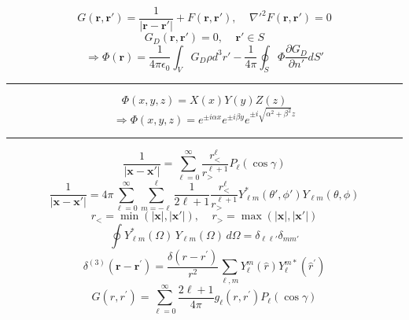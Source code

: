 \documentclass[twocolumn]{article}
\newcommand{\0}{\textcolor{gray}{0}}
\newcommand{\rv}{\mathbf{r}}
\newcommand{\xv}{\mathbf{x}}
\newcommand{\eo}{\epsilon_{0}}
\newcommand{\rdif}{\rv - \rv'}
\begin{document}
\begin{equation*}
	G(\rv,\rv') = \frac{1}{|\rdif|} + F(\rv,\rv'), ~~~~~ \nabla'^2 F(\rv,\rv') = 0
\end{equation*}
\begin{equation*}
	G_{D}(\rv,\rv') = 0, ~~~~~\rv'\in S
\end{equation*}
\begin{equation*}
	\Rightarrow\Phi(\rv) = \frac{1}{4\pi\eo}\int_{V}G_D\rho d^3r' - \frac{1}{4\pi}\oint_{S}\Phi\frac{\partial G_D}{\partial n'} dS'
\end{equation*}
\vspace{-2mm}\hrule\vspace{1mm}
\begin{equation*}
	\Phi(x,y,z) = X(x) Y(y) Z(z)
\end{equation*}
\begin{equation*}
	\Rightarrow\Phi(x,y,z) = e^{\pm i \alpha x} e^{\pm i \beta y} e^{\pm i \sqrt{\alpha^2 + \beta^2} z}
\end{equation*}
\vspace{-2mm}\hrule\vspace{1mm}
\begin{equation*}
	\frac{1}{|\xv - \xv'|} = \sum_{\ell=0}^{\infty} \frac{r_{<}^{\ell}}{r_{>}^{\ell + 1}} P_{\ell}(\cos\gamma)
\end{equation*}
\begin{equation*}
	\frac{1}{|\xv - \xv'|} = 4\pi \sum_{\ell=0}^{\infty} \sum_{m=-\ell}^{\ell} \frac{1}{2\ell + 1} \frac{r_{<}^{\ell}}{r_{>}^{\ell + 1}} Y^{*}_{\ell m}(\theta', \phi') Y_{\ell m}(\theta, \phi) \label{add_theorem}
\end{equation*}
\begin{equation*}
	r_{<} = \min\left(|\xv|, |\xv'|\right), ~~~~~ r_{>} = \max\left(|\xv|, |\xv'|\right)
\end{equation*}
\begin{equation*}
	\oint Y^{*}_{\ell m}(\Omega) \, Y_{\ell m}(\Omega) \, d\Omega = \delta_{\ell \ell'} \delta_{mm'}\label{YY*_ort}
\end{equation*}
\begin{equation*}
	\delta^{(3)}\left(\mathbf{r}-\mathbf{r}^{\prime}\right)=\frac{\delta\left(r-r^{\prime}\right)}{r^2} \sum_{\ell, m} Y_{\ell}^m(\hat{r}) Y_{\ell}^{m *}\left(\hat{r}^{\prime}\right)
\end{equation*}
\begin{equation*}
	G\left(r, r^{\prime}\right)=\sum_{\ell=0}^{\infty} \frac{2 \ell+1}{4 \pi} g_{\ell}\left(r, r^{\prime}\right) P_{\ell}(\cos \gamma)
\end{equation*}
\end{document}
